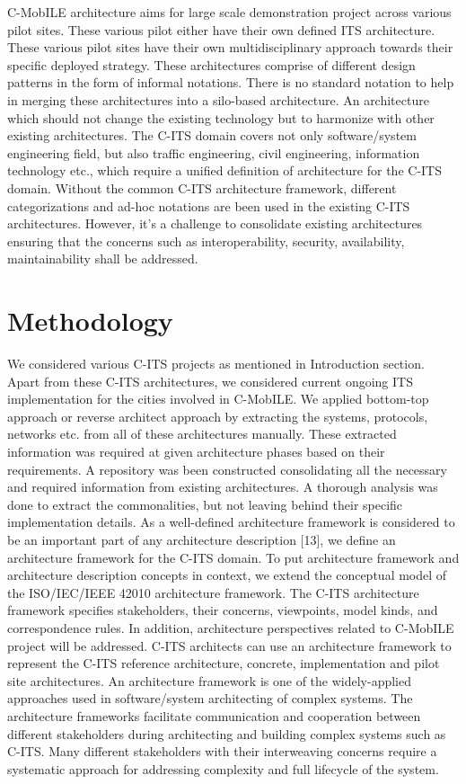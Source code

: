\documentclass[conference]{IEEEtran}
\begin{document}
C-MobILE architecture aims for large scale demonstration project across various pilot sites. These various pilot either have their own defined ITS architecture. These various pilot sites have their own multidisciplinary approach towards their specific deployed strategy. These architectures comprise of different design patterns in the form of informal notations. There is no standard notation to help in merging these architectures into a silo-based architecture. An architecture which should not change the existing technology but to harmonize with other existing architectures. The C-ITS domain covers not only software/system engineering field, but also traffic engineering, civil engineering, information technology etc., which require a unified definition of architecture for the C-ITS domain. Without the common C-ITS architecture framework, different categorizations and ad-hoc notations are been used in the existing C-ITS architectures. However, it's a challenge to consolidate existing architectures ensuring that the concerns such as interoperability, security, availability, maintainability shall be addressed. 

\section{Methodology}

We considered various C-ITS projects as mentioned in Introduction section. Apart from these C-ITS architectures, we considered current ongoing ITS implementation for the cities involved in C-MobILE. We applied bottom-top approach or reverse architect approach by extracting the systems, protocols, networks etc. from all of these architectures manually. These extracted information was required at given architecture phases based on their requirements.  A repository was been constructed consolidating all the necessary and required information from existing architectures. A thorough analysis was done to extract the commonalities, but not leaving behind their specific implementation details. As a well-defined architecture framework is considered to be an important part of any architecture description [13], we define an architecture framework for the C-ITS domain. To put architecture framework and architecture description concepts in context, we extend the conceptual model of the ISO/IEC/IEEE 42010 architecture framework. The C-ITS architecture framework specifies stakeholders, their concerns, viewpoints, model kinds, and correspondence rules. In addition, architecture perspectives related to C-MobILE project will be addressed. C-ITS architects can use an architecture framework to represent the C-ITS reference architecture, concrete, implementation and pilot site architectures. An architecture framework is one of the widely-applied approaches used in software/system architecting of complex systems. The architecture frameworks facilitate communication and cooperation between different stakeholders during architecting and building complex systems such as C-ITS. Many different stakeholders with their interweaving concerns require a systematic approach for addressing complexity and full lifecycle of the system.
\end{document}

